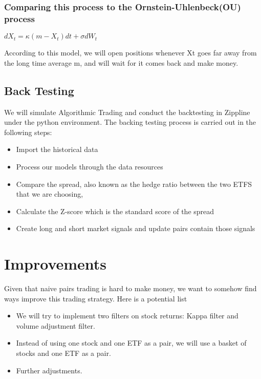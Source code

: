 \documentclass{article}
\begin{document}
\subsubsection*{Comparing this process to the Ornstein-Uhlenbeck(OU) process}
\begin{center}
$dX_t = \kappa(m-X_t)dt + \sigma dW_t$
\end{center}

According to this model, we will open positions whenever Xt goes far away from the long time average m, and will wait for it comes back and make money.






\subsection{Back Testing}
We will simulate Algorithmic Trading and conduct the backtesting in Zippline under the python environment. 
The backing testing process is carried out in the following steps:
\begin{itemize}
\item Import the historical data
\item Process our models through the data resources
\item Compare the spread, also known as the hedge ratio between the two ETFS that we are choosing,  
\item Calculate the Z-score which is the standard score of the spread
\item Create long and short market signals and update pairs contain those signals
\end{itemize}

\section{Improvements}
Given that naive pairs trading is hard to make money, we want to somehow find ways improve this trading strategy. Here is a potential list
\begin{itemize}
\item We will try to implement two filters on stock returns: Kappa filter and volume adjustment filter. 
\item Instead of using one stock and one ETF as a pair, we will use a basket of stocks and one ETF as a pair.
\item Further adjustments.
\end{itemize}


{}

\end{document}
